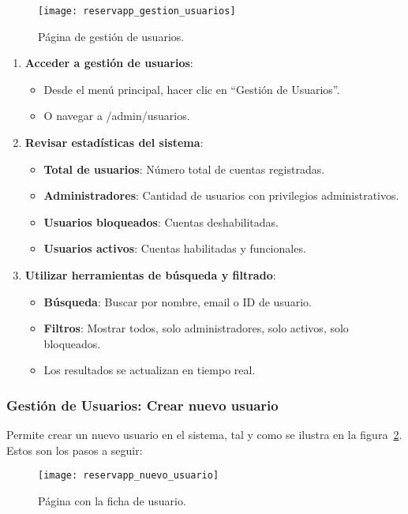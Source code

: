 \begin{figure}[H]
	\centering
		\texttt{[image: reservapp\_gestion\_usuarios]}
	\caption{Página de gestión de usuarios.}
	\label{fig:reservapp_gestion_usuarios}
\end{figure}

\begin{enumerate}
   \item \textbf{Acceder a gestión de usuarios}:
   \begin{itemize}
      \item Desde el menú principal, hacer clic en ``Gestión de Usuarios''.
      \item O navegar a /admin/usuarios.
   \end{itemize}
   \item \textbf{Revisar estadísticas del sistema}:
   \begin{itemize}
      \item \textbf{Total de usuarios}: Número total de cuentas registradas.
      \item \textbf{Administradores}: Cantidad de usuarios con privilegios administrativos.
	  \item \textbf{Usuarios bloqueados}: Cuentas deshabilitadas.
	  \item \textbf{Usuarios activos}: Cuentas habilitadas y funcionales.
   \end{itemize}
   \item \textbf{Utilizar herramientas de búsqueda y filtrado}:
   \begin{itemize}
      \item \textbf{Búsqueda}: Buscar por nombre, email o ID de usuario.
	  \item \textbf{Filtros}: Mostrar todos, solo administradores, solo activos, solo bloqueados.
      \item Los resultados se actualizan en tiempo real.
   \end{itemize}
\end{enumerate}

\subsubsection{Gestión de Usuarios: Crear nuevo usuario}
Permite crear un nuevo usuario en el sistema, tal y como se ilustra en la figura~\ref{fig:reservapp_nuevo_usuario}. Estos son los pasos a seguir:

\begin{figure}[H]
	\centering
		\texttt{[image: reservapp\_nuevo\_usuario]}
	\caption{Página con la ficha de usuario.}
	\label{fig:reservapp_nuevo_usuario}
\end{figure}

